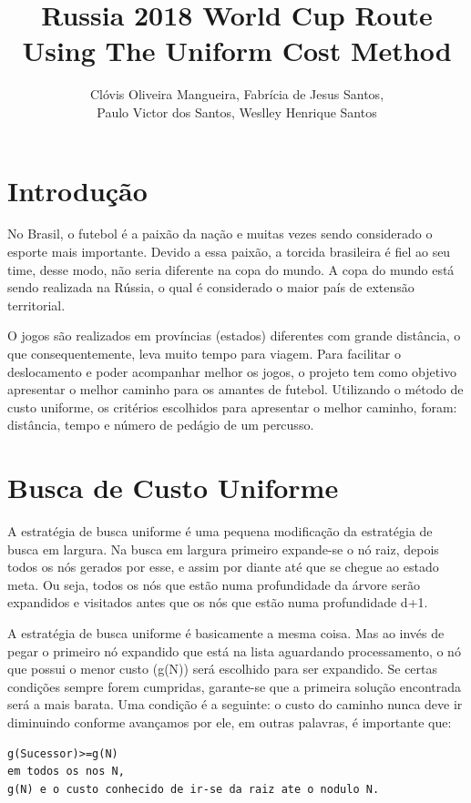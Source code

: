 \documentclass[12pt]{article}
\title{Russia 2018 World Cup Route Using The Uniform Cost Method}
\author{Clóvis Oliveira Mangueira\inst{1}, Fabrícia de Jesus Santos\inst{1}, \\ Paulo Victor dos Santos\inst{1}, Weslley Henrique Santos\inst{1}}
\begin{document}
 

\maketitle

\section{Introdução}
No Brasil, o futebol é a paixão da nação e muitas vezes sendo considerado o esporte mais importante. Devido a essa paixão, a torcida brasileira é fiel ao seu time, desse modo, não seria diferente na copa do mundo. A copa do mundo está sendo realizada na Rússia, o qual é considerado o maior país de extensão territorial. 

O jogos são realizados em províncias (estados) diferentes com grande distância, o que consequentemente, leva muito tempo para viagem. Para facilitar o deslocamento e poder acompanhar melhor os jogos, o projeto tem como objetivo apresentar o melhor caminho para os amantes de futebol. Utilizando o método de custo uniforme, os critérios escolhidos para apresentar o melhor caminho, foram: distância, tempo e número de pedágio de um percusso.
\section{Busca de Custo Uniforme}
A estratégia de busca uniforme é uma pequena modificação da estratégia de busca em largura. Na busca em largura primeiro expande-se o nó raiz, depois todos os nós gerados por esse, e assim por diante até que se chegue ao estado meta. Ou seja, todos os nós que estão numa profundidade da árvore serão expandidos e visitados antes que os nós que estão numa profundidade d+1.

A estratégia de busca uniforme é basicamente a mesma coisa. Mas ao invés de pegar o primeiro nó expandido que está na lista aguardando processamento, o nó que possui o menor custo (g(N)) será escolhido para ser expandido. Se certas condições sempre forem cumpridas, garante-se que a primeira solução encontrada será a mais barata. Uma condição é a seguinte: o custo do caminho nunca deve ir diminuindo conforme avançamos por ele, em outras palavras, é importante que:
\begin{lstlisting}[caption = Pseudo-código para calcular a função g(n)]
g(Sucessor)>=g(N)	
em todos os nos N, 
g(N) e o custo conhecido de ir-se da raiz ate o nodulo N.
\end{lstlisting}
\end{document}
